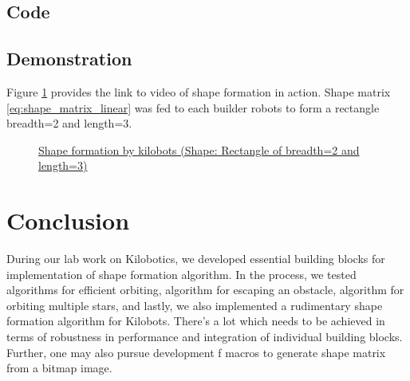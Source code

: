 \documentclass{report}[12pt]
\begin{document}
\section{Code}



\section{Demonstration}
Figure \ref{fig:shape_formation_demo} provides the link to video of shape formation in action. Shape matrix \eqref{eq:shape_matrix_linear} was fed to each builder robots to form a rectangle  breadth=2 and length=3.
\begin{figure}[H]
    \centering
    \caption{\href{https://youtu.be/SoDq9GQvNAE}{Shape formation by kilobots (Shape: Rectangle of breadth=2 and length=3)}}
    \label{fig:shape_formation_demo}
\end{figure}

\chapter{Conclusion}
During our lab work on Kilobotics, we developed essential building blocks for implementation of shape formation algorithm. In the process, we tested algorithms for efficient orbiting, algorithm for escaping an obstacle, algorithm for orbiting multiple stars, and lastly, we also implemented a rudimentary shape formation algorithm for Kilobots. There's a lot which needs to be achieved in terms of robustness in performance and integration of individual building blocks. Further, one may also pursue development f macros to generate shape matrix from a bitmap image.
\end{document}
